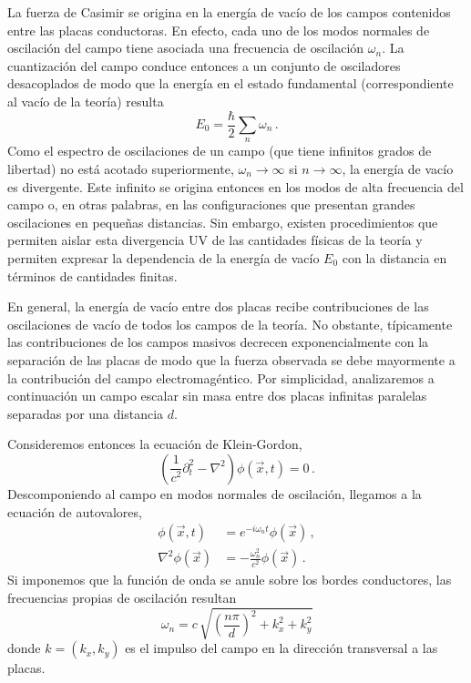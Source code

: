 La fuerza de Casimir se origina en la energía de vacío de los campos contenidos entre las placas conductoras. En efecto, cada uno de los modos normales de oscilación del campo tiene asociada una frecuencia de oscilación $\omega_n$. La cuantización del campo conduce entonces a un conjunto de osciladores desacoplados de modo que la energía en el estado fundamental (correspondiente al vacío de la teoría) resulta
\begin{equation}
E _0 = \frac{\hbar}{2} \sum _n \omega _n\,.
\label{eq.casimir.div}
\end{equation}
Como el espectro de oscilaciones de un campo (que tiene infinitos grados de libertad) no está acotado superiormente, $\omega_n\to\infty$ si $n\to\infty$, la energía de vacío es divergente. Este infinito se origina entonces en los modos de alta frecuencia del campo o, en otras palabras, en las configuraciones que presentan grandes oscilaciones en pequeñas distancias. Sin embargo, existen procedimientos que permiten aislar esta divergencia UV de las cantidades físicas de la teoría y permiten expresar la dependencia de la energía de vacío $E_0$ con la distancia en términos de cantidades finitas.

En general, la energía de vacío entre dos placas recibe contribuciones de las oscilaciones de vacío de todos los campos de la teoría. No obstante, típicamente las contribuciones de los campos masivos decrecen exponencialmente con la separación de las placas de modo que la fuerza observada se debe mayormente a la contribución del campo electromagéntico. Por simplicidad, analizaremos a continuación un campo escalar sin masa entre dos placas infinitas paralelas separadas por una distancia $d$.

Consideremos entonces la ecuación de Klein-Gordon,
\begin{equation}
\left( \frac{1}{c^2} \partial _t ^2 - \nabla  ^2  \right) \phi (\vec{x} ,t) = 0 \,.
\end{equation}
Descomponiendo al campo en modos normales de oscilación, llegamos a la ecuación de autovalores,
\begin{align}
\phi ( \vec{x},t) &= e ^{-i \omega _n t} \phi ( \vec{x}) \,,\\
\nabla ^2 \phi ( \vec{x}) &= - \frac{\omega _n ^2}{c ^2} \phi ( \vec{x})\,.
\end{align}
Si imponemos que la función de onda se anule sobre los bordes conductores, las frecuencias propias de oscilación resultan
\begin{equation}
\omega _n = c\, \sqrt{ \left( \frac{n \pi}{d} \right) ^2 + k _x ^2 + k _y ^2   }
\end{equation}
donde $k=(k_x,k_y)$ es el impulso del campo en la dirección transversal a las placas.

